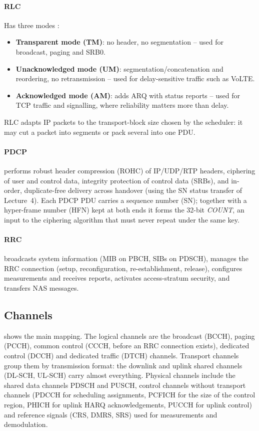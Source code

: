 \documentclass[11pt,a4paper]{article}
\begin{document}
\paragraph{RLC} Has three modes \cite{ts36322}:
\begin{itemize}
  \item \textbf{Transparent mode (TM)}: no header, no segmentation -- used for broadcast, paging
        and SRB0.
  \item \textbf{Unacknowledged mode (UM)}: segmentation/concatenation and reordering, no
        retransmission -- used for delay-sensitive traffic such as VoLTE.
  \item \textbf{Acknowledged mode (AM)}: adds ARQ with status reports -- used for TCP traffic and
        signalling, where reliability matters more than delay.
\end{itemize}
RLC adapts IP packets to the transport-block size chosen by the scheduler: it may cut a packet
into segments or pack several into one PDU.

\paragraph{PDCP} \cite{ts36323} performs robust header compression (ROHC) of IP/UDP/RTP headers,
ciphering of user and control data, integrity protection of control data (SRBs), and in-order,
duplicate-free delivery across handover (using the SN status transfer of Lecture~4). Each PDCP
PDU carries a sequence number (SN); together with a hyper-frame number (HFN) kept at both ends it
forms the 32-bit \emph{COUNT}, an input to the ciphering algorithm that must never repeat under the
same key.

\paragraph{RRC} \cite{ts36331} broadcasts system information (MIB on PBCH, SIBs on PDSCH), manages
the RRC connection (setup, reconfiguration, re-establishment, release), configures measurements
and receives reports, activates access-stratum security, and transfers NAS messages.

\subsection{Channels}
 shows the main mapping. The logical channels are the broadcast (BCCH), paging
(PCCH), common control (CCCH, before an RRC connection exists), dedicated control (DCCH) and
dedicated traffic (DTCH) channels. Transport channels group them by transmission format: the
downlink and uplink shared channels (DL-SCH, UL-SCH) carry almost everything. Physical channels
include the shared data channels PDSCH and PUSCH, control channels without transport channels
(PDCCH for scheduling assignments, PCFICH for the size of the control region, PHICH for uplink
HARQ acknowledgements, PUCCH for uplink control) and reference signals (CRS, DMRS, SRS) used for
measurements and demodulation.
\end{document}
